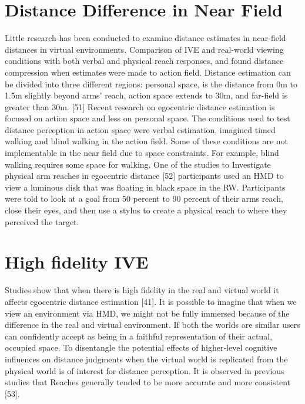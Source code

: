\section{Distance Difference in Near Field}
Little research has been conducted to examine distance estimates in near-field distances in virtual environments. Comparison of IVE and real-world viewing conditions with both verbal and physical reach responses, and found distance compression when estimates were made to action field. Distance estimation can be divided into three different regions: personal space, is the distance from 0m to 1.5m slightly beyond arms’ reach, action space extends to 30m, and far-field is greater than 30m. [51] 
Recent research on egocentric distance estimation is focused on action space and less on personal space. The conditions used to test distance perception in action space were verbal estimation, imagined timed walking and blind walking in the action field. Some of these conditions are not implementable in the near field due to space constraints. For example, blind walking requires some space for walking. One of the studies to Investigate physical arm reaches in egocentric distance [52] participants used an HMD to view a luminous disk that was floating in black space in the RW. Participants were told to look at a goal from 50 percent to 90 percent of their arms reach, close their eyes, and then use a stylus to create a physical reach to where they perceived the target.


\section{High fidelity IVE}
Studies show that when there is high fidelity in the real and virtual world it affects egocentric distance estimation [41]. It is possible to imagine that when we view an environment via HMD, we might not be fully immersed because of the difference in the real and virtual environment. If both the worlds are similar users can confidently accept as being in a faithful representation of their actual, occupied space. To disentangle the potential effects of higher-level cognitive influences on distance judgments when the virtual world is replicated from the physical world is of interest for distance perception. It is observed in previous studies that Reaches generally tended to be more accurate and more consistent [53].


